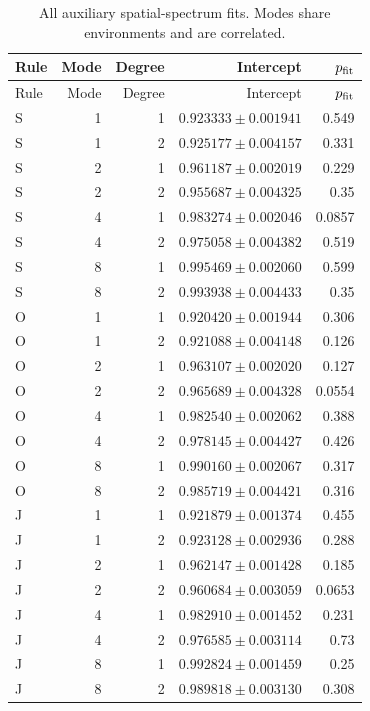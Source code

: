 {\small\setlength{\tabcolsep}{3.5pt}
\begin{longtable}{lrrrr}
\caption{All auxiliary spatial-spectrum fits. Modes share environments and are correlated.}\\
\toprule
Rule & Mode & Degree & Intercept & $p_{\rm fit}$\\
\midrule
\endfirsthead
\toprule
Rule & Mode & Degree & Intercept & $p_{\rm fit}$\\
\midrule
\endhead
\bottomrule\endfoot
S & 1 & 1 & $0.923333\pm0.001941$ & 0.549\\
S & 1 & 2 & $0.925177\pm0.004157$ & 0.331\\
S & 2 & 1 & $0.961187\pm0.002019$ & 0.229\\
S & 2 & 2 & $0.955687\pm0.004325$ & 0.35\\
S & 4 & 1 & $0.983274\pm0.002046$ & 0.0857\\
S & 4 & 2 & $0.975058\pm0.004382$ & 0.519\\
S & 8 & 1 & $0.995469\pm0.002060$ & 0.599\\
S & 8 & 2 & $0.993938\pm0.004433$ & 0.35\\
O & 1 & 1 & $0.920420\pm0.001944$ & 0.306\\
O & 1 & 2 & $0.921088\pm0.004148$ & 0.126\\
O & 2 & 1 & $0.963107\pm0.002020$ & 0.127\\
O & 2 & 2 & $0.965689\pm0.004328$ & 0.0554\\
O & 4 & 1 & $0.982540\pm0.002062$ & 0.388\\
O & 4 & 2 & $0.978145\pm0.004427$ & 0.426\\
O & 8 & 1 & $0.990160\pm0.002067$ & 0.317\\
O & 8 & 2 & $0.985719\pm0.004421$ & 0.316\\
J & 1 & 1 & $0.921879\pm0.001374$ & 0.455\\
J & 1 & 2 & $0.923128\pm0.002936$ & 0.288\\
J & 2 & 1 & $0.962147\pm0.001428$ & 0.185\\
J & 2 & 2 & $0.960684\pm0.003059$ & 0.0653\\
J & 4 & 1 & $0.982910\pm0.001452$ & 0.231\\
J & 4 & 2 & $0.976585\pm0.003114$ & 0.73\\
J & 8 & 1 & $0.992824\pm0.001459$ & 0.25\\
J & 8 & 2 & $0.989818\pm0.003130$ & 0.308\\
\end{longtable}}
